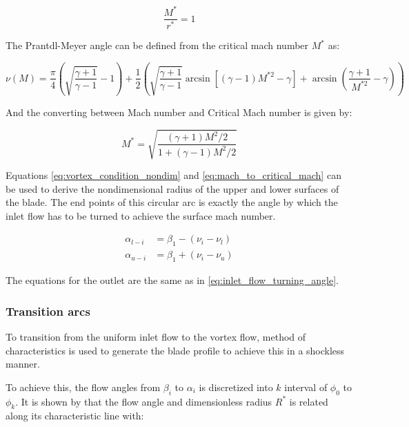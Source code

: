 \begin{equation}
    \frac{M^*}{r^*} = 1
    \label{eq:vortex_condition_nondim}
\end{equation}

The Prantdl-Meyer angle can be defined from the critical mach number $M^*$ as:

\begin{equation}
\nu(M) = \frac{\pi}{4}\left(\sqrt{\frac{\gamma+1}{\gamma-1}} - 1\right) + \frac{1}{2}\left(\sqrt{\frac{\gamma+1}{\gamma-1}} \arcsin\left[(\gamma-1)M^{*2} - \gamma\right] + \arcsin\left(\frac{\gamma+1}{M^{*2}} - \gamma\right)\right)
\label{eq:prandtl_meyer_angle}
\end{equation}

And the converting between Mach number and Critical Mach number is given by:

\begin{equation}
M^* = \sqrt{\frac{(\gamma+1)M^2/2}{1 + (\gamma-1)M^2/2}}
\label{eq:mach_to_critical_mach}
\end{equation}

Equations \cref{eq:vortex_condition_nondim} and \cref{eq:mach_to_critical_mach} can be used to derive the nondimensional radius of the upper and lower surfaces of the blade. The end points of this circular arc is exactly the angle by which the inlet flow has to be turned to achieve the surface mach number. 

\begin{equation}
\begin{aligned}
    \alpha_{l-i} & = \beta_1 - (\nu_i - \nu_l) \\
    \alpha_{u-i} & = \beta_1 + (\nu_i - \nu_u)
\end{aligned}
\label{eq:inlet_flow_turning_angle}
\end{equation}

The equations for the outlet are the same as in \cref{eq:inlet_flow_turning_angle}.

\subsubsection{Transition arcs}

To transition from the uniform inlet flow to the vortex flow, method of characteristics is used to generate the blade profile to achieve this in a shockless manner. 


To achieve this, the flow angles from $\beta_i$ to $\alpha_i$ is discretized into $k$ interval of $\phi_0$ to $\phi_k$. It is shown by  that the flow angle and dimensionless radius $R^*$ is related along its characteristic line with:

